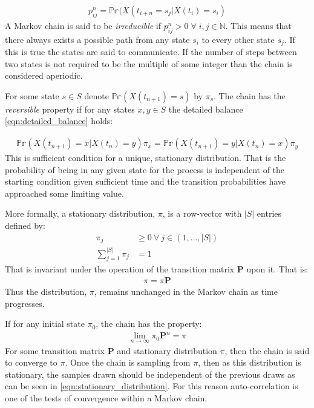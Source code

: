 \documentclass[12pt]{article} %
\begin{document}
\begin{align}
p_{ij}^n = \mathbb{Pr}(X(t_{i+n} = s_j | X(t_i) = s_i)
\end{align}
A Markov chain is said to be \emph{irreducible} if $p_{ij}^n > 0 \; \forall \; i,j \in \mathbb{N}$. This means that there always exists a possible path from any state $s_i$ to every other state $s_j$. If this is true the states are said to communicate. If the number of steps between two states is not required to be the multiple of some integer than the chain is considered aperiodic.

For some state $s \in S$ denote $ \mathbb{Pr}(X(t_{n+1}) = s)$ by $\pi_s$. The chain has the \emph{reversible} property if for any states $x, y \in S$ the detailed balance \eqref{eqn:detailed_balance} holds:

\begin{align} \label{eqn:detailed_balance}
\mathbb{Pr}(X(t_{n+1}) = x | X(t_n) = y)  \pi_x  =  \mathbb{Pr}(X(t_{n+1}) = y | X(t_n) = x) \pi_y
\end{align}
This is sufficient condition for a unique, stationary distribution. That is the probability of being in any given state for the process is independent of the starting condition given sufficient time and the transition probabilities have approached some limiting value. 


More formally, a stationary distribution, $\pi$, is a row-vector with $|S|$ entries defined by:
\begin{align}
\pi_j &\geq 0 \: \forall \: j \in (1,\ldots,|S|) \\
\sum_{j=1}^{|S|}\pi_j &= 1
\end{align}
That is invariant under the operation of the transition matrix $\mathbf{P}$ upon it. That is:
\begin{align} \label{eqn:stationary_distribution}
\pi = \pi\mathbf{P}
\end{align}
Thus the distribution, $\pi$, remains unchanged in the Markov chain as time progresses.

If for any initial state $\pi_0$, the chain has the property:
\begin{align}
\lim_{n\to\infty} \pi_0 \mathbf{P}^n = \pi
\end{align}
For some transition matrix $\mathbf{P}$ and stationary distribution $\pi$, then the chain is said to converge to $\pi$. Once the chain is sampling from $\pi$, then as this distribution is stationary, the samples drawn should be independent of the previous draws as can be seen in \eqref{eqn:stationary_distribution}. For this reason auto-correlation is one of the tests of convergence within a Markov chain.
\end{document}
